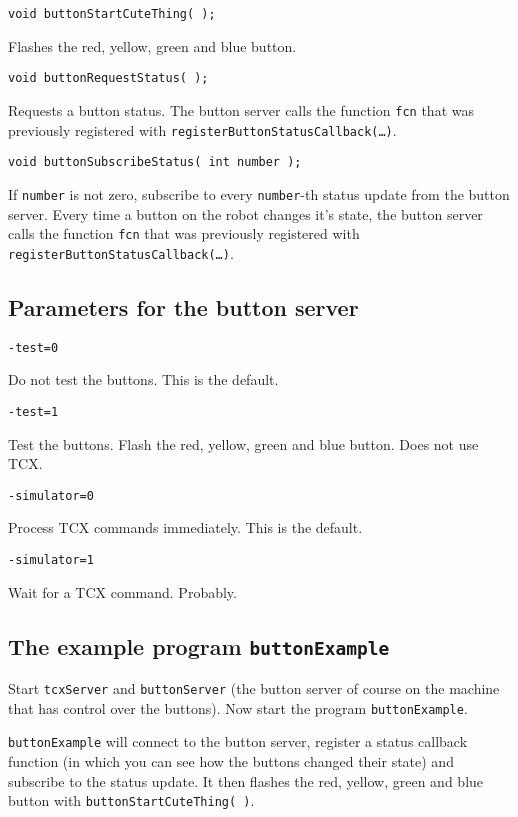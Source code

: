 \documentclass{article}
\begin{document}
\begin{description}
\item \texttt{void buttonStartCuteThing( );}
  
  Flashes the red, yellow, green and blue button.

\item \texttt{void buttonRequestStatus( );}
  
  Requests a button status. The button server calls the function \texttt{fcn}
  that was previously registered with
  \texttt{registerButtonStatusCallback(\dots)}.

\item \texttt{void buttonSubscribeStatus( int number );}
  
  If \texttt{number} is not zero, subscribe to every \texttt{number}-th status
  update from the button server. Every time a button on the robot changes it's
  state, the button server calls the function \texttt{fcn} that was previously
  registered with \texttt{registerButtonStatusCallback(\dots)}.

\end{description}

\subsection{Parameters for the button server}

\begin{description}

\item \texttt{-test=0}
  
  Do not test the buttons. This is the default.

\item \texttt{-test=1}
  
  Test the buttons. Flash the red, yellow, green and blue button. Does not use
  TCX.

\item \texttt{-simulator=0}
  
  Process TCX commands immediately. This is the default.

\item \texttt{-simulator=1}

  Wait for a TCX command. Probably.

\end{description}
 
\subsection{The example program \texttt{buttonExample}}
 
Start \texttt{tcxServer} and \texttt{buttonServer} (the button server of
course on the machine that has control over the buttons). Now start the program
\texttt{buttonExample}.

\texttt{buttonExample} will connect to the button server, register a status
callback function (in which you can see how the buttons changed their state)
and subscribe to the status update. It then flashes the red, yellow, green and
blue button with \texttt{buttonStartCuteThing( )}.
\end{document}
